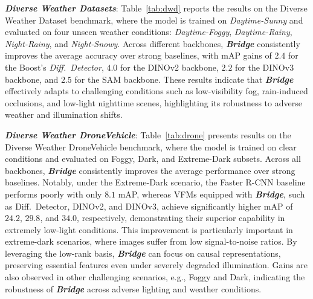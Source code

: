 \noindent\textbf{\textit{Diverse Weather Datasets}}: Table~\ref{tab:dwd} reports the results on the Diverse Weather Dataset benchmark, where the model is trained on \textit{Daytime-Sunny} and evaluated on four unseen weather conditions: \textit{Daytime-Foggy}, \textit{Daytime-Rainy}, \textit{Night-Rainy}, and \textit{Night-Snowy}. Across different backbones, \textbf{\textit{Bridge}} consistently improves the average accuracy over strong baselines, with mAP gains of $\mathbf{2.4}$ for the Boost's \textit{Diff.~Detector}, $\mathbf{4.0}$ for the DINOv2 backbone, $\mathbf{2.2}$ for the DINOv3 backbone, and $\mathbf{2.5}$ for the SAM backbone. These results indicate that \textbf{\textit{Bridge}} effectively adapts to challenging conditions such as low-visibility fog, rain-induced occlusions, and low-light nighttime scenes, highlighting its robustness to adverse weather and illumination shifts.


\noindent\textbf{\textit{Diverse Weather DroneVehicle}}:
Table~\ref{tab:drone} presents results on the Diverse Weather DroneVehicle benchmark, where the model is trained on clear conditions and evaluated on Foggy, Dark, and Extreme-Dark subsets. Across all backbones, \textbf{\textit{Bridge}} consistently improves the average performance over strong baselines. Notably, under the Extreme-Dark scenario, the Faster R-CNN baseline performs poorly with only $\mathbf{8.1}$ mAP, whereas VFMs equipped with \textbf{\textit{Bridge}}, such as Diff.~Detector, DINOv2, and DINOv3, achieve significantly higher mAP of $\mathbf{24.2}$, $\mathbf{29.8}$, and $\mathbf{34.0}$, respectively, demonstrating their superior capability in extremely low-light conditions. This improvement is particularly important in extreme-dark scenarios, where images suffer from low signal-to-noise ratios. By leveraging the low-rank basis, \textbf{\textit{Bridge}} can focus on causal representations, preserving essential features even under severely degraded illumination. Gains are also observed in other challenging scenarios, e.g., Foggy and Dark, indicating the robustness of \textbf{\textit{Bridge}} across adverse lighting and weather conditions.

